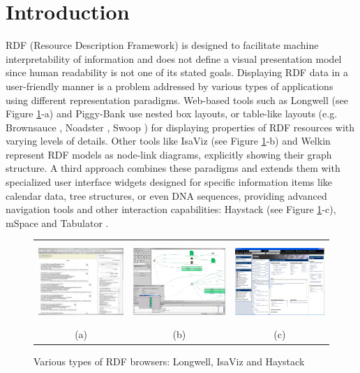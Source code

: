 \section{Introduction}

RDF (Resource Description Framework) is designed to facilitate machine interpretability of information and does not define a visual presentation model since human readability is not one of its stated goals. Displaying RDF data in a user-friendly manner is a problem addressed by various types of applications using different representation paradigms. Web-based tools such as Longwell \cite{simile} (see Figure \ref{rdfBrowsers}-a) and Piggy-Bank \cite{huynh05} use nested box layouts, or table-like layouts (e.g. Brownsauce \cite{Steer03}, Noadster \cite{Rutledge05}, Swoop \cite{MindSwap05}) for displaying properties of RDF resources with varying levels of details. Other tools like IsaViz \cite{isaviz} (see Figure \ref{rdfBrowsers}-b) and Welkin \cite{Welkin} represent RDF models as node-link diagrams, explicitly showing their graph structure. A third approach combines these paradigms and extends them with specialized user interface widgets designed for specific information items like calendar data, tree structures, or even DNA sequences, providing advanced navigation tools and other interaction capabilities: Haystack \cite{Quan03} (see Figure \ref{rdfBrowsers}-c), mSpace \cite{mspace2005} and Tabulator \cite{timbl06}.

\begin{figure}
\begin{center}
\begin{tabular}{ccc}
\includegraphics[height=3cm]{longwell.pdf} &
\includegraphics[height=3cm]{isaviz.pdf} &
\includegraphics[height=3cm]{haystack.pdf} \\
(a) & (b) & (c)\\
\end{tabular}
\caption{Various types of RDF browsers: Longwell, IsaViz and Haystack}
\label{rdfBrowsers}
\end{center}
\end{figure}

